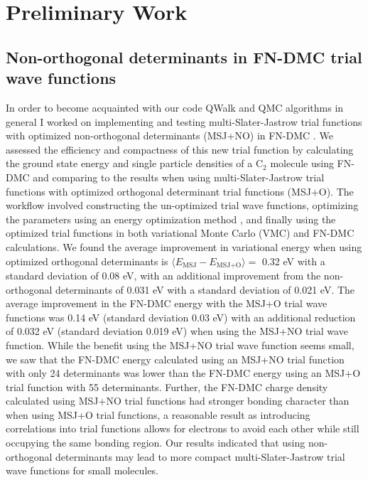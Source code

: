 \documentclass[12pt]{article}
\begin{document}
\section{Preliminary Work}
\subsection{Non-orthogonal determinants in FN-DMC trial wave functions}
In order to become acquainted with our code QWalk \cite{WAGNER20093390} and QMC algorithms in general I worked on implementing and testing multi-Slater-Jastrow trial functions with optimized non-orthogonal determinants (MSJ+NO) in FN-DMC \cite{Pathak2018}.
We assessed the efficiency and compactness of this new trial function by calculating the ground state energy and single particle densities of a C$_2$ molecule using FN-DMC and comparing to the results when using multi-Slater-Jastrow trial functions with optimized orthogonal determinant trial functions (MSJ+O). 
The workflow involved constructing the un-optimized trial wave functions, optimizing the parameters using an energy optimization method \cite{Toulouse2007}, and finally using the optimized trial functions in both variational Monte Carlo (VMC) and FN-DMC calculations. 
We found the average improvement in variational energy when using optimized orthogonal determinants is $\langle E_\text{MSJ} - E_\text{MSJ+O} \rangle = $ 0.32 eV with a standard deviation of 0.08 eV, with an additional improvement from the non-orthogonal determinants of 0.031 eV with a standard deviation of 0.021 eV.
The average improvement in the FN-DMC energy with the MSJ+O trial wave functions was 0.14 eV (standard deviation 0.03 eV) with an additional reduction of 0.032 eV (standard deviation 0.019 eV) when using the MSJ+NO trial wave function.
While the benefit using the MSJ+NO trial wave function seems small, we saw that the FN-DMC energy calculated using an MSJ+NO trial function with only 24 determinants was lower than the FN-DMC energy using an MSJ+O trial function with 55 determinants.
Further, the FN-DMC charge density calculated using MSJ+NO trial functions had stronger bonding character than when using MSJ+O trial functions, a reasonable result as introducing correlations into trial functions allows for electrons to avoid each other while still occupying the same bonding region. 
Our results indicated that using non-orthogonal determinants may lead to more compact multi-Slater-Jastrow trial wave functions for small molecules.
\end{document}
